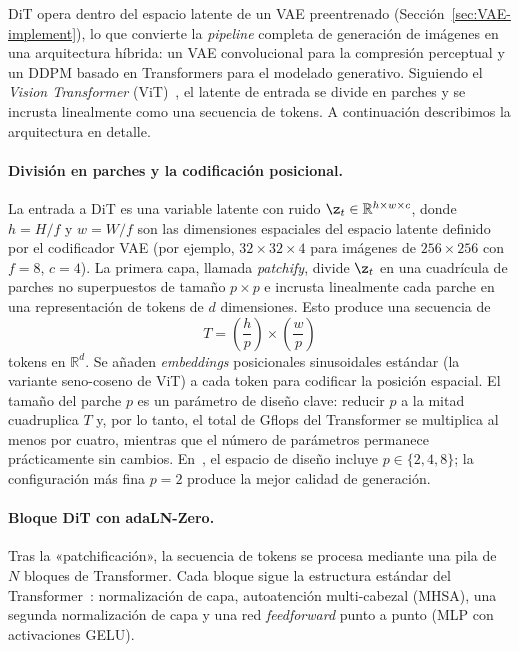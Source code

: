 \documentclass[../../book-main_es.tex]{subfiles}
\begin{document}
DiT opera dentro del espacio latente de un VAE preentrenado (Sección~\ref{sec:VAE-implement}), lo que 
convierte la \textit{pipeline} completa de generación de imágenes en una arquitectura híbrida: un VAE 
convolucional para la compresión perceptual y un DDPM basado en Transformers para el modelado 
generativo. Siguiendo el \textit{Vision Transformer} (ViT)~\citep{dosovitskiy2020image}, el latente de 
entrada se divide en parches y se incrusta linealmente como una secuencia de tokens. A continuación 
describimos la arquitectura en detalle.

\paragraph{División en parches y la codificación posicional.}
La entrada a DiT es una variable latente con ruido $\z_t \in \mathbb{R}^{h \times w \times c}$, 
donde $h = H/f$ y $w = W/f$ son las dimensiones espaciales del espacio latente definido por el 
codificador VAE (por ejemplo, $32 \times 32 \times 4$ para imágenes de $256 \times 256$ con 
$f = 8$, $c = 4$). La primera capa, llamada \emph{patchify}, divide $\z_t$ en una cuadrícula de 
parches no superpuestos de tamaño $p \times p$ e incrusta linealmente cada parche en una 
representación de tokens de $d$ dimensiones. Esto produce una secuencia de
\begin{equation}
    T = \left(\frac{h}{p}\right) \times \left(\frac{w}{p}\right)
\end{equation}
tokens en $\mathbb{R}^d$. Se añaden \textit{embeddings} posicionales sinusoidales estándar (la variante 
seno-coseno de ViT) a cada token para codificar la posición espacial. El tamaño del parche $p$ es 
un parámetro de diseño clave: reducir $p$ a la mitad cuadruplica $T$ y, por lo tanto, el total de 
Gflops del Transformer se multiplica al menos por cuatro, mientras que el número de parámetros permanece 
prácticamente sin cambios. En~\citep{peebles2023scalable}, el espacio de diseño incluye 
$p \in \{2, 4, 8\}$; la configuración más fina $p = 2$ produce la mejor calidad de generación.

\paragraph{Bloque DiT con adaLN-Zero.}
Tras la «patchificación», la secuencia de tokens se procesa mediante una pila de $N$ bloques de 
Transformer. Cada bloque sigue la estructura estándar del Transformer~\citep{vaswani2017attention}: 
normalización de capa, autoatención multi-cabezal (MHSA), una segunda normalización de capa y una red 
\textit{feedforward} punto a punto (MLP con activaciones GELU).
\end{document}
